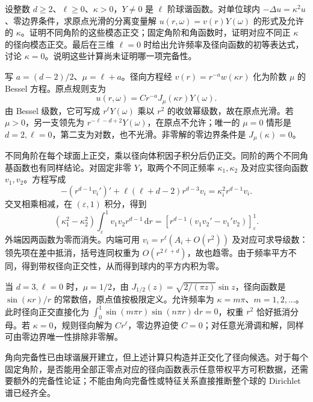 \begin{exercise}\label{b2:ex:B2-helmholtz-ball}
设整数 \(d\ge2\)、\(\ell\ge0\)、\(\kappa>0\)，\(Y\ne0\) 是 \(\ell\) 阶球谐函数。对单位球内 \(-\Delta u=\kappa^2u\)、零边界条件，求原点光滑的分离变量解 \(u(r,\omega)=v(r)Y(\omega)\) 的形式及允许的 \(\kappa\)。证明不同角阶的这些模态正交；固定角阶和角函数时，证明对应不同正 \(\kappa\) 的径向模态正交。最后在三维 \(\ell=0\) 时给出允许频率及径向函数的初等表达式，讨论 \(\kappa=0\)。说明这些计算尚未证明哪一项完备性。
\end{exercise}
\begin{solution}
写 \(a=(d-2)/2\)、\(\mu=\ell+a\)。径向方程经 \(v(r)=r^{-a}w(\kappa r)\) 化为阶数 \(\mu\) 的 Bessel 方程。原点规则支为
\[
 u(r,\omega)=C r^{-a}J_\mu(\kappa r)Y(\omega).
\]
由 Bessel 级数，它可写成 \(r^\ell Y(\omega)\) 乘以 \(r^2\) 的收敛幂级数，故在原点光滑。若 \(\mu>0\)，另一支领先为 \(r^{-\ell-d+2}Y(\omega)\)，在原点不允许；唯一的 \(\mu=0\) 情形是 \(d=2,\ell=0\)，第二支为对数，也不光滑。非零解的零边界条件是 \(J_\mu(\kappa)=0\)。

不同角阶在每个球面上正交，乘以径向体积因子积分后仍正交。同阶的两个不同角基函数也有同样结论。对固定非零 \(Y\)，取两个不同正频率 \(\kappa_1,\kappa_2\) 及对应实径向函数 \(v_1,v_2\)。方程写成
\[
 -(r^{d-1}v_i')'+\ell(\ell+d-2)r^{d-3}v_i
      =\kappa_i^2r^{d-1}v_i.
\]
交叉相乘相减，在 \((\varepsilon,1)\) 积分，得到
\[
 (\kappa_1^2-\kappa_2^2)
 \int_\varepsilon^1v_1v_2r^{d-1}\,\mathrm dr
 =\left[r^{d-1}(v_1v_2'-v_1'v_2)\right]_\varepsilon^1.
\]
外端因两函数为零而消失。内端可用 \(v_i=r^\ell(A_i+O(r^2))\) 及对应可求导级数：领先项在差中抵消，括号连同权重为 \(O(r^{2\ell+d})\)，故也趋零。由于频率平方不同，得到带权径向正交性，从而得到球内的平方内积为零。

当 \(d=3,\ell=0\) 时，\(\mu=1/2\)，由 \(J_{1/2}(z)=\sqrt{2/(\pi z)}\sin z\)，径向函数是 \(\sin(\kappa r)/r\) 的常数倍，原点值按极限定义。允许频率为 \(\kappa=m\pi\)、\(m=1,2,\ldots\)。此时径向正交直接化为 \(\int_0^1\sin(m\pi r)\sin(n\pi r)\,\mathrm dr=0\)，权重 \(r^2\) 恰好抵消分母。若 \(\kappa=0\)，规则径向解为 \(Cr^\ell\)，零边界迫使 \(C=0\)；对任意光滑调和解，同样可由零边界唯一性排除非零解。

角向完备性已由球谐展开建立，但上述计算只构造并正交化了径向候选。对于每个固定角阶，是否能用全部正零点对应的径向函数表示任意带权平方可积数据，还需要额外的完备性论证；不能由角向完备性或特征关系直接推断整个球的 Dirichlet 谱已经齐全。
\end{solution}
